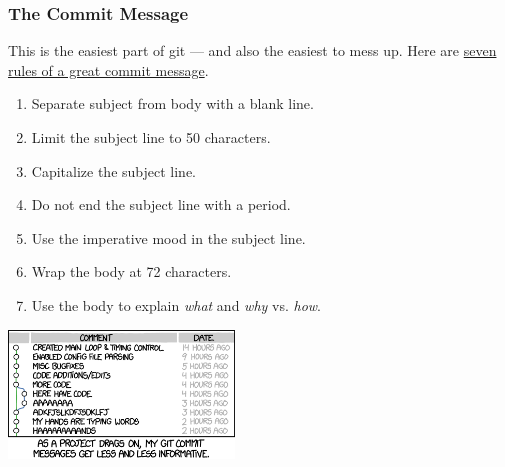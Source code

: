 \documentclass{beamer}
\newcounter{committing}
\newcommand{\shellcmd}[1]{\texttt{\colorbox{gray!30}{#1}}}
\newcommand{\presentcount}[1]{\addtocounter{#1}{1}\Roman{#1}}
\begin{document}

\begin{frame}
    \frametitle{The Commit Message}
    This is the easiest part of git --- and also the easiest to mess up. Here are \href{http://chris.beams.io/posts/git-commit/}{seven rules of a great commit message}.
    \begin{multicols}{2}
        \begin{enumerate}
            \item Separate subject from body with a blank line.
            \item Limit the subject line to 50 characters.
            \item Capitalize the subject line.
            \item Do not end the subject line with a period.
            \item Use the imperative mood in the subject line.
            \item Wrap the body at 72 characters.
            \item Use the body to explain \textit{what} and \textit{why} vs. \textit{how}.
        \end{enumerate}

        \begin{center}
            \includegraphics[width=0.45\textwidth]{xkcd-2}
        \end{center}
    \end{multicols}
\end{frame}
\end{document}
